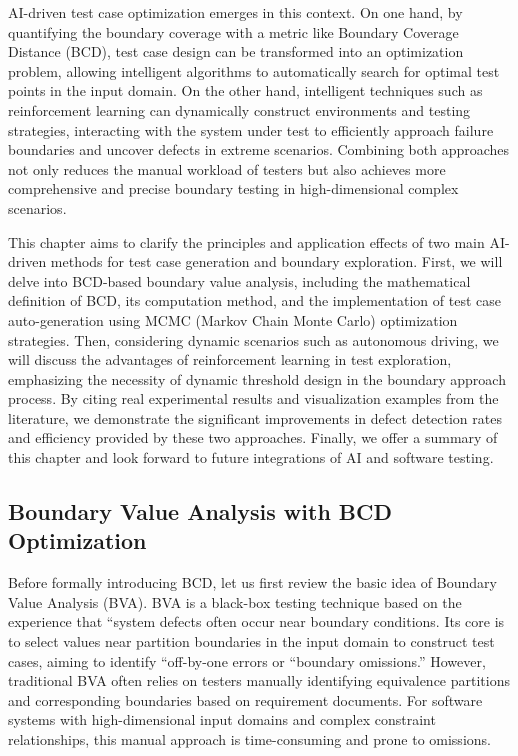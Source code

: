 \documentclass[manuscript,screen,review]{acmart}
\begin{document}
AI-driven test case optimization emerges in this context. On one hand, by quantifying the boundary coverage with a metric like Boundary Coverage Distance (BCD), test case design can be transformed into an optimization problem, allowing intelligent algorithms to automatically search for optimal test points in the input domain. On the other hand, intelligent techniques such as reinforcement learning can dynamically construct environments and testing strategies, interacting with the system under test to efficiently approach failure boundaries and uncover defects in extreme scenarios. Combining both approaches not only reduces the manual workload of testers but also achieves more comprehensive and precise boundary testing in high-dimensional complex scenarios.

This chapter aims to clarify the principles and application effects of two main AI-driven methods for test case generation and boundary exploration. First, we will delve into BCD-based boundary value analysis, including the mathematical definition of BCD, its computation method, and the implementation of test case auto-generation using MCMC (Markov Chain Monte Carlo) optimization strategies. Then, considering dynamic scenarios such as autonomous driving, we will discuss the advantages of reinforcement learning in test exploration, emphasizing the necessity of dynamic threshold design in the boundary approach process. By citing real experimental results and visualization examples from the literature, we demonstrate the significant improvements in defect detection rates and efficiency provided by these two approaches. Finally, we offer a summary of this chapter and look forward to future integrations of AI and software testing.
\subsection{Boundary Value Analysis with BCD Optimization}

Before formally introducing BCD, let us first review the basic idea of Boundary Value Analysis (BVA). BVA is a black-box testing technique based on the experience that ``system defects often occur near boundary conditions. Its core is to select values near partition boundaries in the input domain to construct test cases, aiming to identify ``off-by-one errors or ``boundary omissions.'' However, traditional BVA often relies on testers manually identifying equivalence partitions and corresponding boundaries based on requirement documents. For software systems with high-dimensional input domains and complex constraint relationships, this manual approach is time-consuming and prone to omissions.
\end{document}
